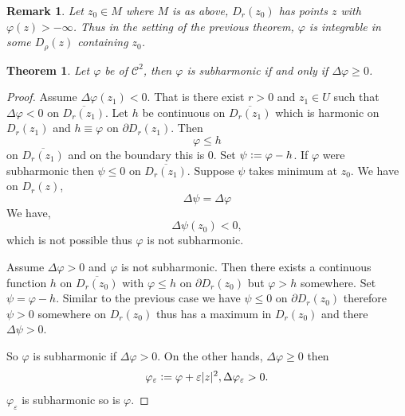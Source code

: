 \documentclass{article}
\newtheorem{theorem}{Theorem} [section]
\newtheorem{remark}{Remark}[section]
\newcommand{\defeq}{\vcentcolon=}
\newcommand{\bd}[0]{\partial}
\begin{document}
\begin{remark}
  Let $z_0\in M$ where $M$ is as above, $D_r(z_0)$ has points $z$ with $\varphi(z)>-\infty$. Thus in the setting of the previous theorem, $\varphi$ is integrable in some $D_\rho(z)$ containing $z_0$.
\end{remark}

\begin{theorem}
  Let $\varphi$ be of $\mathcal{C}^2$, then $\varphi$ is subharmonic if and only if $\Delta\varphi\geq0$.
\end{theorem}

\begin{proof}
  Assume $\Delta\varphi(z_1)<0$. That is there exist $r>0$ and $z_1\in U$ such that $\Delta\varphi<0$ on $\overline{D_r(z_1)}$. Let $h$ be continuous on $\overline{D_r(z_1)}$ which is harmonic on $D_r(z_1)$ and $h\equiv\varphi$ on $\bd D_r(z_1)$. Then 
  \begin{equation*}
    \varphi\leq h
  \end{equation*}
  on $\overline{D_r(z_1)}$ and on the boundary this is $0$. Set $\psi \defeq \varphi-h$. If $\varphi$ were subharmonic then $\psi\leq0$ on $\overline{D_r(z_1)}$. Suppose $\psi$ takes minimum at $z_0$. We have on $D_r(z)$, 
  \begin{equation*}
    \Delta\psi=\Delta\varphi
  \end{equation*}
  We have,
  \begin{equation*}
    \Delta\psi(z_0)<0,
  \end{equation*}
  which is not possible thus $\varphi$ is not subharmonic.%
  \par Assume $\Delta\varphi>0$ and $\varphi$ is not subharmonic. Then there exists a continuous function $h$ on $\overline{D_r(z_0)}$ with $\varphi\leq h$ on $\bd D_r(z_0)$ but $\varphi>h$ somewhere. Set $\psi=\varphi-h$.
  Similar to the previous case we have $\psi\leq0$ on $\bd D_r(z_0)$ therefore $\psi>0$ somewhere on $D_r(z_0)$ thus has a maximum in $D_r(z_0)$ and there $\Delta\psi>0$. 
  \par So $\varphi$ is subharmonic if $\Delta\varphi>0$. On the other hands, $\Delta\varphi\geq0$ then 
  \begin{equation*}
    \varphi_\varepsilon\defeq \varphi+\varepsilon\vert z\vert^2, \Delta\varphi_\varepsilon>0.
  \end{equation*}
  $\varphi_\varepsilon$ is subharmonic so is $\varphi$.%
\end{proof}
\end{document}

